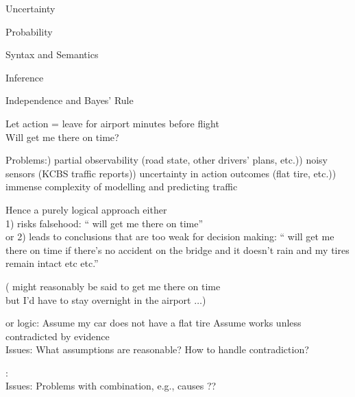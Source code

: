 \documentclass{article}
\begin{document}
\begin{huge}

\sf


\blob Uncertainty

\blob Probability

\blob Syntax and Semantics

\blob Inference

\blob Independence and Bayes' Rule



Let action  = leave for airport  minutes before flight\\
Will  get me there on time?

Problems:) partial observability (road state, other drivers' plans, etc.)) noisy sensors (KCBS traffic reports)) uncertainty in action outcomes (flat tire, etc.)) immense complexity of modelling and predicting traffic

Hence a purely logical approach either\\
\phantom{or }1) risks falsehood: `` will get me there on time''\\
or 2) leads to conclusions that are too weak for decision making:\nl
`` will get me there on time if there's no accident on the bridge\nl
and it doesn't rain and my tires remain intact etc etc.''

( might reasonably be said to get me there on time\\
but I'd have to stay overnight in the airport $\ldots$)




 or  logic:\al
  Assume my car does not have a flat tire\al
  Assume  works unless contradicted by evidence\\
Issues: What assumptions are reasonable? How to handle contradiction?

:\al
{}\al
{}\al
{}\\
Issues: Problems with combination, e.g.,  causes ??


\end{huge}
\end{document}
